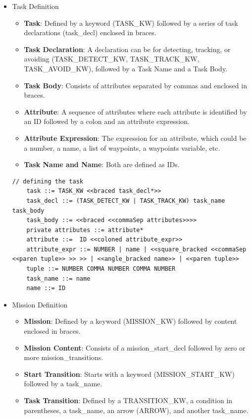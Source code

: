 \begin{itemize}
    \item Task Definition
    \begin{itemize}
        \item \textbf{Task}: Defined by a keyword (TASK\_KW) followed by a series of task declarations (task\_decl) enclosed in braces.
        \item \textbf{Task Declaration}: A declaration can be for detecting, tracking, or avoiding (TASK\_DETECT\_KW, TASK\_TRACK\_KW, TASK\_AVOID\_KW), followed by a Task Name and a Task Body.
        \item \textbf{Task Body}: Consists of attributes separated by commas and enclosed in braces.
        \item \textbf{Attribute}: A sequence of attributes where each attribute is identified by an ID followed by a colon and an attribute expression.
        \item \textbf{Attribute Expression}: The expression for an attribute, which could be a number, a name, a list of waypoints, a waypoints variable, etc.
        \item \textbf{Task Name and Name}: Both are defined as IDs.
    \end{itemize}
    \begin{lstlisting}[style=customgo]
    // defining the task
    task ::= TASK_KW <<braced task_decl*>>
    task_decl ::= (TASK_DETECT_KW | TASK_TRACK_KW) task_name task_body
    task_body ::= <<braced <<commaSep attributes>>>>
    private attributes ::= attribute*
    attribute ::=  ID <<coloned attribute_expr>>
    attribute_expr ::= NUMBER | name | <<square_bracked <<commaSep <<paren tuple>> >> >> | <<angle_bracked name>> | <<paren tuple>>
    tuple ::= NUMBER COMMA NUMBER COMMA NUMBER
    task_name ::= name
    name ::= ID
    \end{lstlisting}    
    \item Mission Definition
    \begin{itemize}
        \item \textbf{Mission}: Defined by a keyword (MISSION\_KW) followed by content enclosed in braces.
        \item \textbf{Mission Content}: Consists of a mission\_start\_decl followed by zero or more mission\_transitions.
        \item \textbf{Start Transition}: Starts with a keyword (MISSION\_START\_KW) followed by a task\_name.
        \item \textbf{Task Transition}: Defined by a TRANSITION\_KW, a condition in parentheses, a task\_name, an arrow (ARROW), and another task\_name.

\end{itemize}
\end{itemize}
